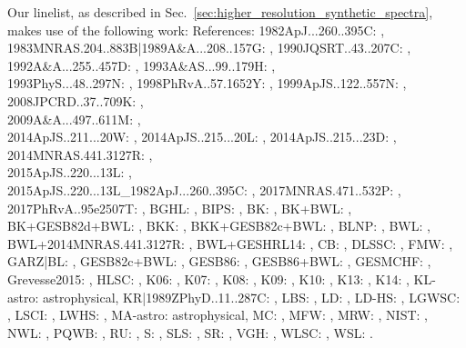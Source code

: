 \documentclass[
  journal=pasa,
  manuscript=research-paper, %
  year=2024,
  volume=37
]{cup-journal}
\begin{document}
Our linelist, as described in Sec.~\ref{sec:higher_resolution_synthetic_spectra}, makes use of the following work: References: 1982ApJ...260..395C: \cite{1982ApJ...260..395C},  1983MNRAS.204..883B|1989A\&A...208..157G: \cite{1983MNRAS.204..883B,1989A&A...208..157G},  1990JQSRT..43..207C: \cite{1990JQSRT..43..207C}, 
1992A\&A...255..457D: \cite{1992A&A...255..457D},  1993A\&AS...99..179H: \cite{1993A&AS...99..179H}, \\ 1993PhyS...48..297N: \cite{1993PhyS...48..297N},  1998PhRvA..57.1652Y: \cite{1998PhRvA..57.1652Y}, 
1999ApJS..122..557N: \cite{1999ApJS..122..557N},  2008JPCRD..37..709K: \cite{2008JPCRD..37..709K},  \\ 2009A\&A...497..611M: \cite{2009A&A...497..611M},  \\ 
2014ApJS..211...20W: \cite{2014ApJS..211...20W},  2014ApJS..215...20L: \cite{2014ApJS..215...20L},  2014ApJS..215...23D: \cite{2014ApJS..215...23D},  2014MNRAS.441.3127R: \cite{2014MNRAS.441.3127R},  \\
2015ApJS..220...13L: \cite{2015ApJS..220...13L},   \\ 2015ApJS..220...13L\_1982ApJ...260..395C: \cite{2015ApJS..220...13L,1982ApJ...260..395C},  2017MNRAS.471..532P: \cite{2017MNRAS.471..532P}, 
2017PhRvA..95e2507T: \cite{2017PhRvA..95e2507T},  BGHL: \cite{BGHL},  BIPS: \cite{BIPS},  BK: \cite{BK},  BK+BWL: \cite{BK,BWL},  BK+GESB82d+BWL: \cite{BK,GESB82d,BWL},  BKK: \cite{BKK}, 
BKK+GESB82c+BWL: \cite{BKK,GESB82c,BWL},  BLNP: \cite{BLNP},  BWL: \cite{BWL},   \\ BWL+2014MNRAS.441.3127R: \cite{BWL,2014MNRAS.441.3127R},  BWL+GESHRL14: \cite{BWL,GESHRL14},  CB: \cite{CB},  DLSSC: \cite{DLSSC}, 
FMW: \cite{FMW},  GARZ|BL: \cite{GARZ,BL},  GESB82c+BWL: \cite{GESB82c,BWL},  GESB86: \cite{GESB86},  GESB86+BWL: \cite{GESB86,BWL},  GESMCHF: \cite{GESMCHF},  Grevesse2015: \cite{Grevesse2015},  HLSC: \cite{HLSC}, 
K06: \cite{K06},  K07: \cite{K07},  K08: \cite{K08},  K09: \cite{K09},  K10: \cite{K10},  K13: \cite{K13},  K14: \cite{K14},  KL-astro: astrophysical,  KR|1989ZPhyD..11..287C: \cite{KR,1989ZPhyD..11..287C}, 
LBS: \cite{LBS},  LD: \cite{LD},  LD-HS: \cite{LD-HS},  LGWSC: \cite{LGWSC},  LSCI: \cite{LSCI},  LWHS: \cite{LWHS},  MA-astro: astrophysical,  MC: \cite{MC},  MFW: \cite{MFW},  MRW: \cite{MRW},  NIST: \cite{NIST10}, 
NWL: \cite{NWL},  PQWB: \cite{PQWB},  RU: \cite{RU},  S: \cite{S},  SLS: \cite{SLS},  SR: \cite{SR},  VGH: \cite{VGH},  WLSC: \cite{WLSC},  WSL: \cite{WSL}.


\end{document}
